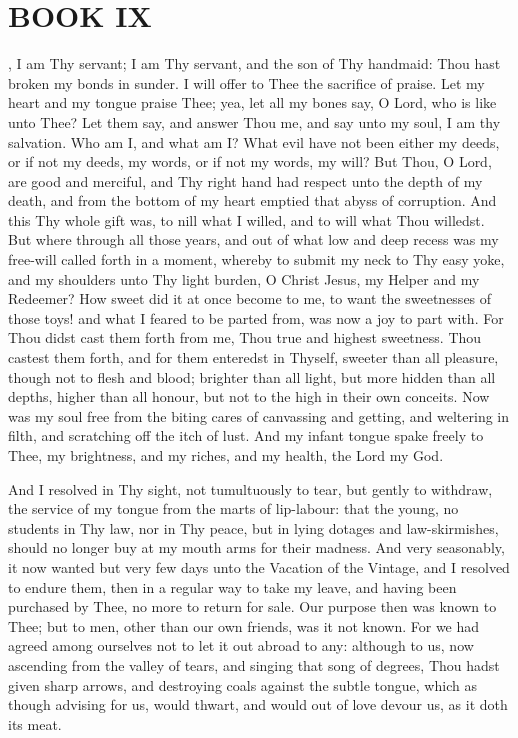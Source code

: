 \documentclass[b5paper,openright,12pt,twoside]{book}
\begin{document}
\chapter{BOOK IX}


, I am Thy servant; I am Thy servant, and the son of Thy handmaid:
Thou hast broken my bonds in sunder. I will offer to Thee the sacrifice
of praise. Let my heart and my tongue praise Thee; yea, let all my bones
say, O Lord, who is like unto Thee? Let them say, and answer Thou me,
and say unto my soul, I am thy salvation. Who am I, and what am I? What
evil have not been either my deeds, or if not my deeds, my words, or if
not my words, my will? But Thou, O Lord, are good and merciful, and Thy
right hand had respect unto the depth of my death, and from the bottom
of my heart emptied that abyss of corruption. And this Thy whole gift
was, to nill what I willed, and to will what Thou willedst. But where
through all those years, and out of what low and deep recess was my
free-will called forth in a moment, whereby to submit my neck to Thy
easy yoke, and my shoulders unto Thy light burden, O Christ Jesus, my
Helper and my Redeemer? How sweet did it at once become to me, to want
the sweetnesses of those toys! and what I feared to be parted from, was
now a joy to part with. For Thou didst cast them forth from me, Thou
true and highest sweetness. Thou castest them forth, and for them
enteredst in Thyself, sweeter than all pleasure, though not to flesh and
blood; brighter than all light, but more hidden than all depths, higher
than all honour, but not to the high in their own conceits. Now was my
soul free from the biting cares of canvassing and getting, and weltering
in filth, and scratching off the itch of lust. And my infant tongue
spake freely to Thee, my brightness, and my riches, and my health, the
Lord my God.

And I resolved in Thy sight, not tumultuously to tear, but gently to
withdraw, the service of my tongue from the marts of lip-labour: that
the young, no students in Thy law, nor in Thy peace, but in lying
dotages and law-skirmishes, should no longer buy at my mouth arms for
their madness. And very seasonably, it now wanted but very few days unto
the Vacation of the Vintage, and I resolved to endure them, then in a
regular way to take my leave, and having been purchased by Thee, no
more to return for sale. Our purpose then was known to Thee; but to men,
other than our own friends, was it not known. For we had agreed among
ourselves not to let it out abroad to any: although to us, now ascending
from the valley of tears, and singing that song of degrees, Thou hadst
given sharp arrows, and destroying coals against the subtle tongue,
which as though advising for us, would thwart, and would out of love
devour us, as it doth its meat.
\end{document}
